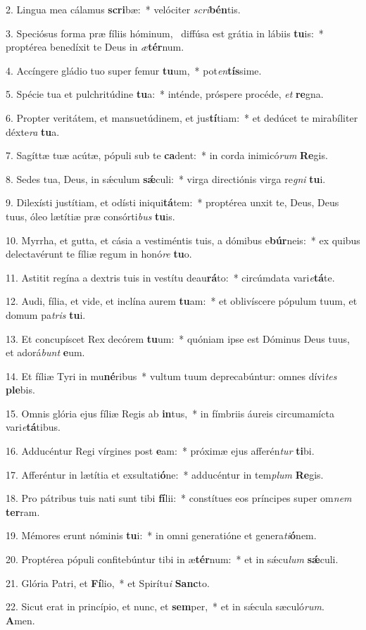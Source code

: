 2. Lingua mea cálamus \textbf{scri}bæ:~*  velóciter \textit{scri}\textbf{bén}tis.\

3. Speciósus forma præ fíliis hóminum, \dag\  diffúsa est grátia in lábiis \textbf{tu}is:~*  proptérea benedíxit te Deus in \textit{æ}\textbf{tér}num.\

4. Accíngere gládio tuo super femur \textbf{tu}um,~*  pot\textit{en}\textbf{tís}sime.\

5. Spécie tua et pulchritúdine \textbf{tu}a:~*  inténde, próspere procéde, \textit{et} \textbf{re}gna.\

6. Propter veritátem, et mansuetúdinem, et jus\textbf{tí}tiam:~*  et dedúcet te mirabíliter déxte\textit{ra} \textbf{tu}a.\

7. Sagíttæ tuæ acútæ, pópuli sub te \textbf{ca}dent:~*  in corda inimicó\textit{rum} \textbf{Re}gis.\

8. Sedes tua, Deus, in sǽculum \textbf{sǽ}culi:~*  virga directiónis virga re\textit{gni} \textbf{tu}i.\

9. Dilexísti justítiam, et odísti iniqui\textbf{tá}tem:~*  proptérea unxit te, Deus, Deus tuus, óleo lætítiæ præ consórti\textit{bus} \textbf{tu}is.\

10. Myrrha, et gutta, et cásia a vestiméntis tuis, a dómibus e\textbf{búr}neis:~*  ex quibus delectavérunt te fíliæ regum in honó\textit{re} \textbf{tu}o.\

11. Astitit regína a dextris tuis in vestítu deau\textbf{rá}to:~*  circúmdata vari\textit{e}\textbf{tá}te.\

12. Audi, fília, et vide, et inclína aurem \textbf{tu}am:~*  et oblivíscere pópulum tuum, et domum pa\textit{tris} \textbf{tu}i.\

13. Et concupíscet Rex decórem \textbf{tu}um:~*  quóniam ipse est Dóminus Deus tuus, et adorá\textit{bunt} \textbf{e}um.\

14. Et fíliæ Tyri in mu\textbf{né}ribus~*  vultum tuum deprecabúntur: omnes dívi\textit{tes} \textbf{ple}bis.\

15. Omnis glória ejus fíliæ Regis ab \textbf{in}tus,~*  in fímbriis áureis circumamícta vari\textit{e}\textbf{tá}tibus.\

16. Adducéntur Regi vírgines post \textbf{e}am:~*  próximæ ejus afferén\textit{tur} \textbf{ti}bi.\

17. Afferéntur in lætítia et exsultati\textbf{ó}ne:~*  adducéntur in tem\textit{plum} \textbf{Re}gis.\

18. Pro pátribus tuis nati sunt tibi \textbf{fí}lii:~*  constítues eos príncipes super om\textit{nem} \textbf{ter}ram.\

19. Mémores erunt nóminis \textbf{tu}i:~*  in omni generatióne et genera\textit{ti}\textbf{ó}nem.\

20. Proptérea pópuli confitebúntur tibi in æ\textbf{tér}num:~*  et in sǽcu\textit{lum} \textbf{sǽ}culi.\

21. Glória Patri, et \textbf{Fí}lio,~*  et Spirítu\textit{i} \textbf{Sanc}to.\

22. Sicut erat in princípio, et nunc, et \textbf{sem}per,~*  et in sǽcula sæculó\textit{rum}. \textbf{A}men.\

